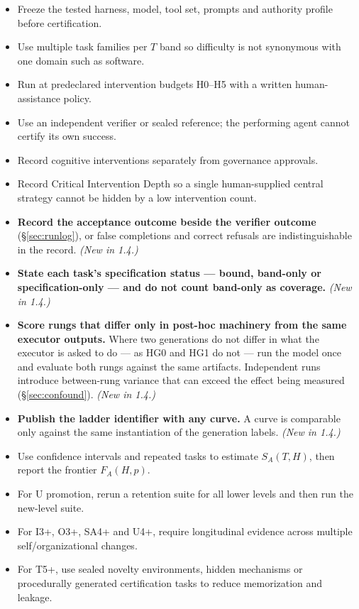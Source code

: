 \documentclass[11pt]{article}
\theoremstyle{definition}
\newcommand{\SA}{\ensuremath{S_A(T,H)}}
\newcommand{\FA}{\ensuremath{F_A(H,p)}}
\begin{document}
\begin{itemize}
\item Freeze the tested harness, model, tool set, prompts and authority profile before certification.
\item Use multiple task families per $T$ band so difficulty is not synonymous with one domain such as software.
\item Run at predeclared intervention budgets H0--H5 with a written human-assistance policy.
\item Use an independent verifier or sealed reference; the performing agent cannot certify its own success.
\item Record cognitive interventions separately from governance approvals.
\item Record Critical Intervention Depth so a single human-supplied central strategy cannot be hidden by a low intervention count.
\item \textbf{Record the acceptance outcome beside the verifier outcome} (\S\ref{sec:runlog}), or false completions and correct refusals are indistinguishable in the record. \emph{(New in 1.4.)}
\item \textbf{State each task's specification status --- bound, band-only or specification-only --- and do not count band-only as coverage.} \emph{(New in 1.4.)}
\item \textbf{Score rungs that differ only in post-hoc machinery from the same executor outputs.} Where two generations do not differ in what the executor is asked to do --- as HG0 and HG1 do not --- run the model once and evaluate both rungs against the same artifacts. Independent runs introduce between-rung variance that can exceed the effect being measured (\S\ref{sec:confound}). \emph{(New in 1.4.)}
\item \textbf{Publish the ladder identifier with any curve.} A curve is comparable only against the same instantiation of the generation labels. \emph{(New in 1.4.)}
\item Use confidence intervals and repeated tasks to estimate \SA{}, then report the frontier \FA{}.
\item For U promotion, rerun a retention suite for all lower levels and then run the new-level suite.
\item For I3+, O3+, SA4+ and U4+, require longitudinal evidence across multiple self/organizational changes.
\item For T5+, use sealed novelty environments, hidden mechanisms or procedurally generated certification tasks to reduce memorization and leakage.
\end{itemize}
\end{document}

